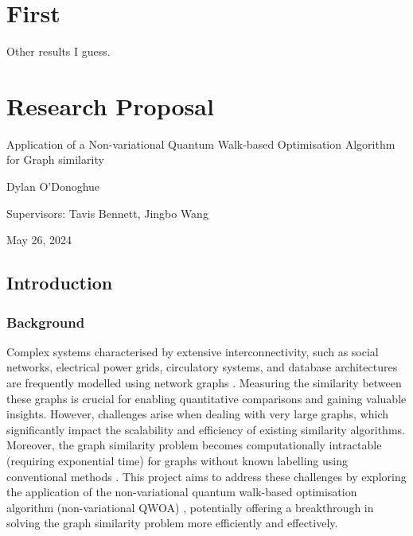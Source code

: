 \chapter{First}

Other results I guess.

\chapter{Research Proposal}

\begin{center}
    \Large Application of a Non-variational Quantum Walk-based Optimisation Algorithm for Graph similarity

    \large Dylan O'Donoghue

    Supervisors: Tavis Bennett, Jingbo Wang

    May 26, 2024
\end{center}

\section{Introduction}
\subsection{Background}
Complex systems characterised by extensive interconnectivity, such as social networks, electrical power grids, circulatory systems, and database architectures are frequently modelled using network graphs \cite{databases}. Measuring the similarity between these graphs is crucial for enabling quantitative comparisons and gaining valuable insights. However, challenges arise when dealing with very large graphs, which significantly impact the scalability and efficiency of existing similarity algorithms. Moreover, the graph similarity problem becomes computationally intractable (requiring exponential time) for graphs without known labelling using conventional methods \cite{how_similar}. This project aims to address these challenges by exploring the application of the non-variational quantum walk-based optimisation algorithm (non-variational QWOA) \cite{bennett2024nonvariational}, potentially offering a breakthrough in solving the graph similarity problem more efficiently and effectively.

